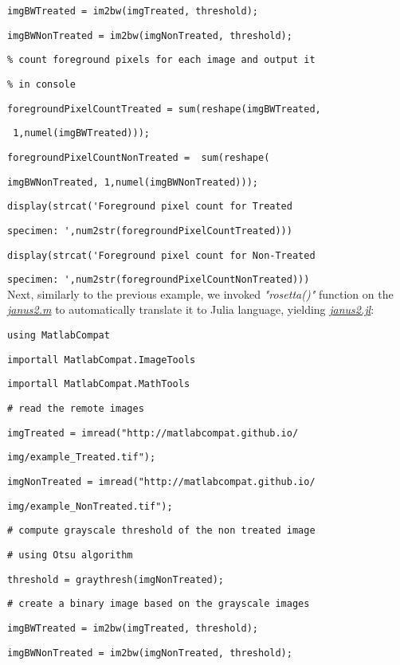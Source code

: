 \verb|imgBWTreated = im2bw(imgTreated, threshold);|

\verb|imgBWNonTreated = im2bw(imgNonTreated, threshold);|

\verb|% count foreground pixels for each image and output it|

\verb|% in console|

\verb|foregroundPixelCountTreated = sum(reshape(imgBWTreated,|

\verb| 1,numel(imgBWTreated)));|

\verb|foregroundPixelCountNonTreated =  sum(reshape(|

\verb|imgBWNonTreated, 1,numel(imgBWNonTreated)));|

\verb|display(strcat('Foreground pixel count for Treated |

\verb|specimen: ',num2str(foregroundPixelCountTreated)))|

\verb|display(strcat('Foreground pixel count for Non-Treated|

\verb|specimen: ',num2str(foregroundPixelCountNonTreated)))|\\


Next, similarly to the previous example, we invoked \textit{"rosetta()"} function on the \textit{\href{http://}{janus2.m}} to automatically translate it to Julia language, yielding \textit{\href{http://}{janus2.jl}}:


\verb|using MatlabCompat|

\verb|importall MatlabCompat.ImageTools|

\verb|importall MatlabCompat.MathTools|

\verb|# read the remote images|

\verb|imgTreated = imread("http://matlabcompat.github.io/|

\verb|img/example_Treated.tif");|

\verb|imgNonTreated = imread("http://matlabcompat.github.io/|

\verb|img/example_NonTreated.tif");|

\verb|# compute grayscale threshold of the non treated image|

\verb|# using Otsu algorithm|

\verb|threshold = graythresh(imgNonTreated);|

\verb|# create a binary image based on the grayscale images|

\verb|imgBWTreated = im2bw(imgTreated, threshold);|

\verb|imgBWNonTreated = im2bw(imgNonTreated, threshold);|


